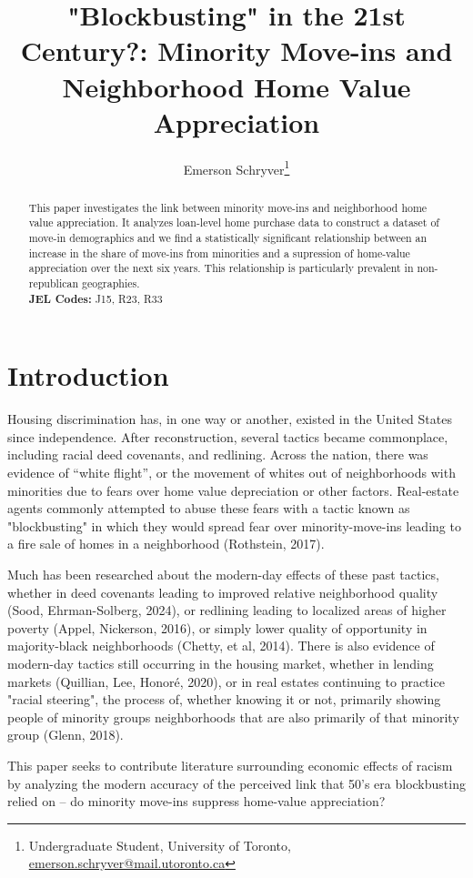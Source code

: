 \documentclass{article}
\title{"Blockbusting" in the 21st Century?: Minority Move-ins and Neighborhood Home Value Appreciation}
\author{Emerson Schryver\thanks{Undergraduate Student, University of Toronto, \href{mailto:emerson.schryver@mail.utoronto.ca}{emerson.schryver@mail.utoronto.ca}}}
\begin{document}
\maketitle
\begin{abstract}
    This paper investigates the link between minority move-ins and neighborhood home value appreciation. It analyzes loan-level home purchase data to construct a dataset of move-in demographics and we find a statistically significant relationship between an increase in the share of move-ins from minorities and a supression of home-value appreciation over the next six years. This relationship is particularly prevalent in non-republican geographies.
    \\

    \textbf{JEL Codes:} J15, R23, R33
\end{abstract}
\newpage
\section{Introduction}
Housing discrimination has, in one way or another, existed in the United States since independence. After reconstruction, several tactics became commonplace, including racial deed covenants, and redlining. Across the nation, there was evidence of ``white flight'', or the movement of whites out of neighborhoods with minorities due to fears over home value depreciation or other factors. Real-estate agents commonly attempted to abuse these fears with a tactic known as "blockbusting" in which they would spread fear over minority-move-ins leading to a fire sale of homes in a neighborhood (Rothstein, 2017).

Much has been researched about the modern-day effects of these past tactics, whether in deed covenants leading to improved relative neighborhood quality (Sood, Ehrman-Solberg, 2024), or redlining leading to localized areas of higher poverty (Appel, Nickerson, 2016), or simply lower quality of opportunity in majority-black neighborhoods (Chetty, et al, 2014). There is also evidence of modern-day tactics still occurring in the housing market, whether in lending markets (Quillian, Lee, Honoré, 2020), or in real estates continuing to practice "racial steering", the process of, whether knowing it or not, primarily showing people of minority groups neighborhoods that are also primarily of that minority group (Glenn, 2018). 

This paper seeks to contribute literature surrounding economic effects of racism  by analyzing the modern accuracy of the perceived link that 50's era blockbusting relied on -- do minority move-ins suppress home-value appreciation?
\end{document}
